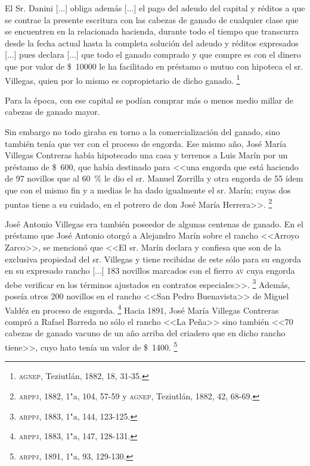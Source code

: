 \documentclass[14pt,twoside,final]{extbook} %
\let\oldfootnote\footnote
\renewcommand\footnote[1]{%
\oldfootnote{\hspace{1mm}#1}}
\begin{document}
\begin{quoting}
El Sr. Danini [...] obliga además [...] el pago del adeudo del capital y réditos a que se contrae la presente escritura con las cabezas de ganado de cualquier clase que se encuentren en la relacionada hacienda, durante todo el tiempo que transcurra desde la fecha actual hasta la completa solución del adeudo y réditos expresados [...] pues declara [...] que todo el ganado comprado y que compre es con el dinero que por valor de \$~10000 le ha facilitado en préstamo o mutuo con hipoteca el sr. Villegas, quien por lo mismo es copropietario de dicho ganado.\footnote{\textsc{agnep}, Teziutlán, 1882, 18, 31-35.}
\end{quoting}
Para la época, con ese capital se podían comprar más o menos medio millar de cabezas de ganado mayor.

Sin embargo no todo giraba en torno a la comercialización del ganado, sino también tenía que ver con el proceso de engorda. Ese mismo año, José María Villegas Contreras había hipotecado una casa y terrenos a Luis Marín por un préstamo de \$~600, que había destinado para <<una engorda que está haciendo de 97 novillos que al 60~\% le dio el sr. Manuel Zorrilla y otra engorda de 55 ídem que con el mismo fin y a medias le ha dado igualmente el sr. Marín; cuyas dos puntas tiene a su cuidado, en el potrero de don José María Herrera>>.\footnote{\textsc{arppj}, 1882, 1"a, 104, 57-59 y \textsc{agnep}, Teziutlán, 1882, 42, 68-69.}

José Antonio Villegas era también poseedor de algunas centenas de ganado. En el préstamo que José Antonio otorgó a Alejandro Marín sobre el rancho <<Arroyo Zarco>>, se mencionó que <<El sr. Marín declara y confiesa que son de la exclusiva propiedad del sr. Villegas y tiene recibidas de este sólo para su engorda en su expresado rancho [...] 183 novillos marcados con el fierro \textsc{av} cuya engorda debe verificar en los términos ajustados en contratos especiales>>.\footnote{\textsc{arppj}, 1883, 1"a, 144, 123-125.} Además, poseía otros 200 novillos en el rancho <<San Pedro Buenavista>> de Miguel Valdéz en proceso de engorda.\footnote{\textsc{arppj}, 1883, 1"a, 147, 128-131.} Hacia 1891, José María Villegas Contreras compró a Rafael Barreda no sólo el rancho <<La Peña>> sino también <<70 cabezas de ganado vacuno de un año arriba del criadero que en dicho rancho tiene>>,
cuyo hato tenía un valor de \$~1400.\footnote{\textsc{arppj}, 1891, 1"a, 93, 129-130.}
\end{document}
